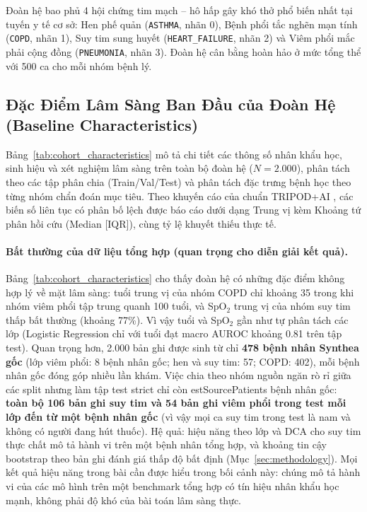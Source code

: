 Đoàn hệ bao phủ 4 hội chứng tim mạch -- hô hấp gây khó thở phổ biến nhất tại tuyến y tế cơ sở: Hen phế quản (\texttt{ASTHMA}, nhãn 0), Bệnh phổi tắc nghẽn mạn tính (\texttt{COPD}, nhãn 1), Suy tim sung huyết (\texttt{HEART\_FAILURE}, nhãn 2) và Viêm phổi mắc phải cộng đồng (\texttt{PNEUMONIA}, nhãn 3). Đoàn hệ cân bằng hoàn hảo ở mức tổng thể với 500 ca cho mỗi nhóm bệnh lý.



\subsection{Đặc Điểm Lâm Sàng Ban Đầu của Đoàn Hệ (Baseline Characteristics)}
Bảng~\ref{tab:cohort_characteristics} mô tả chi tiết các thông số nhân khẩu học, sinh hiệu và xét nghiệm lâm sàng trên toàn bộ đoàn hệ ($N = 2.000$), phân tách theo các tập phân chia (Train/Val/Test) và phân tách đặc trưng bệnh học theo từng nhóm chẩn đoán mục tiêu. Theo khuyến cáo của chuẩn TRIPOD+AI \cite{collins2024tripod}, các biến số liên tục có phân bố lệch được báo cáo dưới dạng Trung vị kèm Khoảng tứ phân hồi cứu (Median [IQR]), cùng tỷ lệ khuyết thiếu thực tế.



\paragraph{Bất thường của dữ liệu tổng hợp (quan trọng cho diễn giải kết quả).} Bảng~\ref{tab:cohort_characteristics} cho thấy đoàn hệ có những đặc điểm không hợp lý về mặt lâm sàng: tuổi trung vị của nhóm COPD chỉ khoảng 35 trong khi nhóm viêm phổi tập trung quanh 100 tuổi, và SpO$_2$ trung vị của nhóm suy tim thấp bất thường (khoảng 77\%). Vì vậy tuổi và SpO$_2$ gần như tự phân tách các lớp (Logistic Regression chỉ với tuổi đạt macro AUROC khoảng 0.81 trên tập test). Quan trọng hơn, 2.000 bản ghi được sinh từ chỉ \textbf{478 bệnh nhân Synthea gốc} (lớp viêm phổi: 8 bệnh nhân gốc; hen và suy tim: 57; COPD: 402), mỗi bệnh nhân gốc đóng góp nhiều lần khám. Việc chia theo nhóm nguồn ngăn rò rỉ giữa các split nhưng làm tập test strict chỉ còn 	estSourcePatients{} bệnh nhân gốc: \textbf{toàn bộ 106 bản ghi suy tim và 54 bản ghi viêm phổi trong test mỗi lớp đến từ một bệnh nhân gốc} (vì vậy mọi ca suy tim trong test là nam và không có người đang hút thuốc). Hệ quả: hiệu năng theo lớp và DCA cho suy tim thực chất mô tả hành vi trên một bệnh nhân tổng hợp, và khoảng tin cậy bootstrap theo bản ghi đánh giá thấp độ bất định (Mục~\ref{sec:methodology}). Mọi kết quả hiệu năng trong bài cần được hiểu trong bối cảnh này: chúng mô tả hành vi của các mô hình trên một benchmark tổng hợp có tín hiệu nhân khẩu học mạnh, không phải độ khó của bài toán lâm sàng thực.

